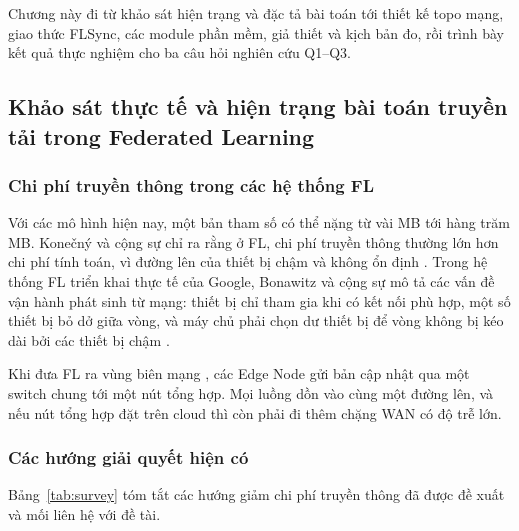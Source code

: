 \setcounter{section}{2}
\setcounter{equation}{0}
Chương này đi từ khảo sát hiện trạng và đặc tả bài toán tới thiết kế topo mạng, giao thức FLSync, các module phần mềm, giả thiết và kịch bản đo, rồi trình bày kết quả thực nghiệm cho ba câu hỏi nghiên cứu Q1--Q3.

\subsection{Khảo sát thực tế và hiện trạng bài toán truyền tải trong Federated Learning}
\label{sec:2-1}

\subsubsection{Chi phí truyền thông trong các hệ thống FL}
Với các mô hình hiện nay, một bản tham số có thể nặng từ vài MB tới hàng trăm MB. Konečný và cộng sự chỉ ra rằng ở FL, chi phí truyền thông thường lớn hơn chi phí tính toán, vì đường lên của thiết bị chậm và không ổn định \cite{konecny2016communication}. Trong hệ thống FL triển khai thực tế của Google, Bonawitz và cộng sự mô tả các vấn đề vận hành phát sinh từ mạng: thiết bị chỉ tham gia khi có kết nối phù hợp, một số thiết bị bỏ dở giữa vòng, và máy chủ phải chọn dư thiết bị để vòng không bị kéo dài bởi các thiết bị chậm \cite{bonawitz2019towards}.

Khi đưa FL ra vùng biên mạng \cite{shi2016edge}, các Edge Node gửi bản cập nhật qua một switch chung tới một nút tổng hợp. Mọi luồng dồn vào cùng một đường lên, và nếu nút tổng hợp đặt trên cloud thì còn phải đi thêm chặng WAN có độ trễ lớn.

\subsubsection{Các hướng giải quyết hiện có}
Bảng~\ref{tab:survey} tóm tắt các hướng giảm chi phí truyền thông đã được đề xuất và mối liên hệ với đề tài.

